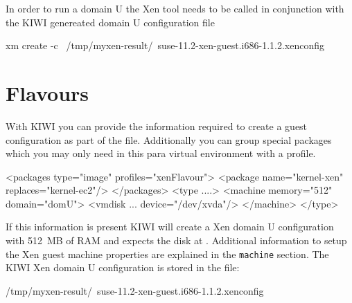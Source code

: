In order to run a domain U the Xen tool  needs to be called
in conjunction with the KIWI genereated domain U configuration file

\begin{Command}{13cm}
xm create -c \
   /tmp/myxen-result/\
   suse-11.2-xen-guest.i686-1.1.2.xenconfig
\end{Command}

\section{Flavours}

With KIWI you can provide the information
required to create a guest configuration as part of the 
file. Additionally you can group special packages which you may only
need in this para virtual environment with a profile.

\begin{xml}
<packages type="image" profiles="xenFlavour">
   <package name="kernel-xen" replaces="kernel-ec2"/>
</packages>
<type ....>
   <machine memory="512" domain="domU">
      <vmdisk ... device="/dev/xvda"/>
   </machine>
</type>
\end{xml}

If this information is present KIWI will create a Xen domain U
configuration with 512~MB of RAM and expects the disk at .
Additional information to setup the Xen guest machine properties are
explained in the \texttt{machine} section. The KIWI Xen domain U
configuration is stored in the file:

\begin{Command}{13cm}
/tmp/myxen-result/\
    suse-11.2-xen-guest.i686-1.1.2.xenconfig
\end{Command}


